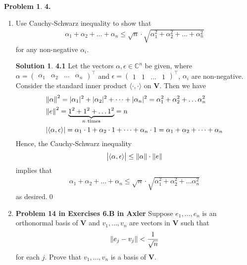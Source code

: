 \documentclass{book}
\theoremstyle{definition}
\newtheorem*{prob*}{Problem}
\newtheorem*{sln*}{Solution}
\newcommand{\V}{\mathbf{V}}
\newcommand{\la}{\langle}
\newcommand{\ra}{\rangle}
\begin{document}
\newpage





\begin{prob*}\textbf{4.}
	\begin{enumerate}
		\item Use Cauchy-Schwarz inequality to show that 
		\begin{align*}
		\alpha_1 + \alpha_2 + \dots + \alpha_n \leq 
		\sqrt{n}\cdot \sqrt{\alpha_1^2+ \alpha_2^2 + \dots + \alpha_n^2}
		\end{align*}
		for any non-negative $\alpha_i$.
		
		\begin{sln*}\textbf{4.1}
			Let the vectors $\alpha, \epsilon \in \mathbb{C}^n $ be given, where $\alpha = \begin{pmatrix}
			\alpha_1 & \alpha_2 & \dots & \alpha_n
			\end{pmatrix}^\top$ and $\epsilon = \begin{pmatrix}
			1 & 1 & \dots & 1
			\end{pmatrix}^\top$, $\alpha_i$ are non-negative. Consider the standard inner product $\la \cdot,\cdot \ra$ on $\V$. Then we have
			\begin{align*}
			&\norm{\alpha}^2 = \vert \alpha_1 \vert^2 + \vert \alpha_2 \vert^2 + \dots + \vert \alpha_n \vert^2 = \alpha_1^2 + \alpha_2^2 + \dots \alpha_n^2\\
			&\norm{e}^2  = \underbrace{1^2 + 1^2 + \dots 1^2}_{n \text{ times}} = n\\
			&\vert \la \alpha,\epsilon\ra\vert = \alpha_1 \cdot 1 +  \alpha_2 \cdot 1 +  \dots + \alpha_n \cdot 1 = \alpha_1 + \alpha_2 + \dots + \alpha_n 
			\end{align*} Hence, the Cauchy-Schwarz inequality
			\begin{align*}
			\big\vert \la \alpha , \epsilon \ra \big\vert \leq \norm{\alpha}\cdot \norm{e}
			\end{align*}
			implies that 
			\begin{align*}
			\alpha_1 + \alpha_2 + \dots + \alpha_n  \leq \sqrt{n}\cdot \sqrt{\alpha_1^2 + \alpha_2^2 + \dots \alpha_n^2}
			\end{align*}
			as desired.\qed
		\end{sln*}
		
		
		\newpage
		
		
		
		\item \textbf{Problem 14 in Exercises 6.B in Axler} Suppose $e_1,\dots,e_n$ is an orthonormal basis of $\V$ and $v_1,\dots,v_n$ are vectors in $\V$ such that
		\begin{align*}
		\norm{e_j - v_j } < \frac{1}{\sqrt{n}}
		\end{align*}
		for each $j$. Prove that $v_1,\dots,v_n$ is a basis of $\V$.
		

\end{enumerate}
\end{prob*}
\end{document}
